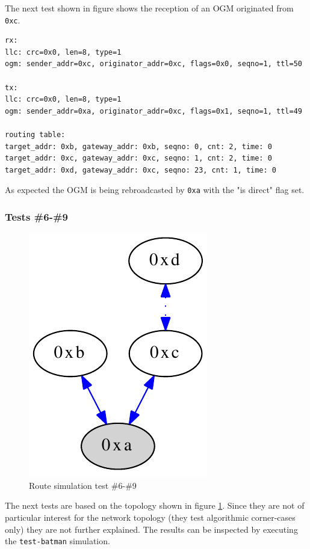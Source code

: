 The next test shown in figure shows the reception of an OGM originated from \texttt{0xc}.

\begin{lstlisting}[label=sim:test1,caption=Output of Test \#5]
rx:
llc: crc=0x0, len=8, type=1
ogm: sender_addr=0xc, originator_addr=0xc, flags=0x0, seqno=1, ttl=50

tx:
llc: crc=0x0, len=8, type=1
ogm: sender_addr=0xa, originator_addr=0xc, flags=0x1, seqno=1, ttl=49

routing table: 
target_addr: 0xb, gateway_addr: 0xb, seqno: 0, cnt: 2, time: 0
target_addr: 0xc, gateway_addr: 0xc, seqno: 1, cnt: 2, time: 0
target_addr: 0xd, gateway_addr: 0xc, seqno: 23, cnt: 1, time: 0
\end{lstlisting}

As expected the OGM is being rebroadcasted by \texttt{0xa} with the "is direct" flag set.

\subsubsection{Tests \#6-\#9}%
\begin{figure}[H]
  \begin{center}
    \includegraphics[]{figures/test6}
  \end{center}
  \caption{Route simulation test \#6-\#9}
  \label{fig:test6-9} 
\end{figure}

The next tests are based on the topology shown in figure \ref{fig:test6-9}. Since they are not of particular interest for the network topology (they test algorithmic corner-cases only) they are not further explained. The results can be inspected by executing the \texttt{test-batman} simulation.

